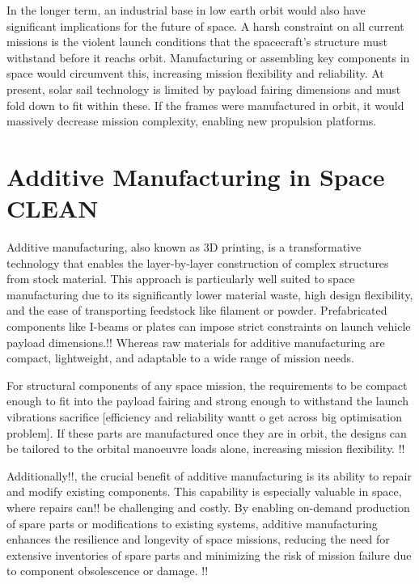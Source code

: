 In the longer term, an industrial base in low earth orbit would also have significant implications for the future of space. A harsh constraint on all current missions is the violent launch conditions that the spacecraft's structure must withstand before it reachs orbit. Manufacturing or assembling key components in space would circumvent this, increasing mission flexibility and reliability. At present, solar sail technology is limited by payload fairing dimensions and must fold down to fit within these. If the frames were manufactured in orbit, it would massively decrease mission complexity, enabling new propulsion platforms.

\newpage
\section{Additive Manufacturing in Space CLEAN}
Additive manufacturing, also known as 3D printing, is a transformative technology that enables the layer-by-layer construction of complex structures from stock material. This approach is particularly well suited to space manufacturing due to its significantly lower material waste, high design flexibility, and the ease of transporting feedstock like filament or powder. Prefabricated components like I-beams or plates can impose strict constraints on launch vehicle payload dimensions.!! Whereas raw materials for additive manufacturing are compact, lightweight, and adaptable to a wide range of mission needs.

For structural components of any space mission, the requirements to be compact enough to fit into the payload fairing and strong enough to withstand the launch vibrations sacrifice [efficiency and reliability wantt o get across big optimisation problem]. If these parts are manufactured once they are in orbit, the designs can be tailored to the orbital manoeuvre loads alone, increasing mission flexibility. !!

Additionally!!, the crucial benefit of additive manufacturing is its ability to repair and modify existing components. This capability is especially valuable in space, where repairs can!! be challenging and costly. By enabling on-demand production of spare parts or modifications to existing systems, additive manufacturing enhances the resilience and longevity of space missions, reducing the need for extensive inventories of spare parts and minimizing the risk of mission failure due to component obsolescence or damage. !!

